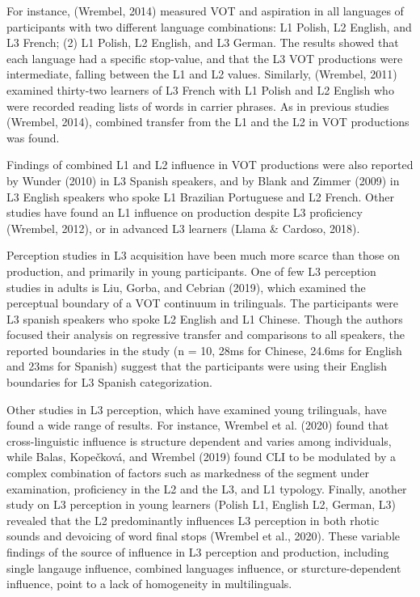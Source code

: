 \documentclass[
  english,
  man]{apa6}
\begin{document}
For instance, (Wrembel, 2014) measured VOT and aspiration in all languages of participants with two different language combinations: L1 Polish, L2 English, and L3 French; (2) L1 Polish, L2 English, and L3 German.
The results showed that each language had a specific stop-value, and that the L3 VOT productions were intermediate, falling between the L1 and L2 values.
Similarly, (Wrembel, 2011) examined thirty-two learners of L3 French with L1 Polish and L2 English who were recorded reading lists of words in carrier phrases.
As in previous studies (Wrembel, 2014), combined transfer from the L1 and the L2 in VOT productions was found.

Findings of combined L1 and L2 influence in VOT productions were also reported by Wunder (2010) in L3 Spanish speakers, and by Blank and Zimmer (2009) in L3 English speakers who spoke L1 Brazilian Portuguese and L2 French.
Other studies have found an L1 influence on production despite L3 proficiency (Wrembel, 2012), or in advanced L3 learners (Llama \& Cardoso, 2018).

Perception studies in L3 acquisition have been much more scarce than those on production, and primarily in young participants.
One of few L3 perception studies in adults is Liu, Gorba, and Cebrian (2019), which examined the perceptual boundary of a VOT continuum in trilinguals.
The participants were L3 spanish speakers who spoke L2 English and L1 Chinese.
Though the authors focused their analysis on regressive transfer and comparisons to all speakers, the reported boundaries in the study (n = 10, 28ms for Chinese, 24.6ms for English and 23ms for Spanish) suggest that the participants were using their English boundaries for L3 Spanish categorization.

Other studies in L3 perception, which have examined young trilinguals, have found a wide range of results.
For instance, Wrembel et al. (2020) found that cross-linguistic influence is structure dependent and varies among individuals, while Balas, Kopečková, and Wrembel (2019) found CLI to be modulated by a complex combination of factors such as markedness of the segment under examination, proficiency in the L2 and the L3, and L1 typology.
Finally, another study on L3 perception in young learners (Polish L1, English L2, German, L3) revealed that the L2 predominantly influences L3 perception in both rhotic sounds and devoicing of word final stops (Wrembel et al., 2020). These variable findings of the source of influence in L3 perception and production, including single langauge influence, combined languages influence, or sturcture-dependent influence, point to a lack of homogeneity in multilinguals.
\end{document}

